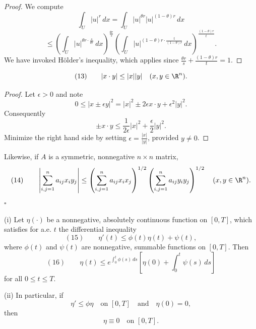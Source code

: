 \begin{proof}
We compute
$$\int_U |u|^r\,dx = \int_U |u|^{\theta r}|u|^{(1-\theta)r}\,dx$$
$$\leq \left(\int_U |u|^{\theta r \cdot \frac{s}{\theta r}}\,dx\right)^{\frac{\theta r}{s}} \left(\int_U |u|^{(1-\theta)r \cdot \frac{t}{(1-\theta) r}}\,dx\right)^{\frac{(1-\theta) r}{t}}.$$
We have invoked Hölder's inequality, which applies since $\frac{\theta r}{s} + \frac{(1-\theta)r}{t} = 1$.
\end{proof}

\begin{lemma}
\label{lem:cauchy-schwarz-inequality}
$$(13) \qquad |x \cdot y| \leq |x||y| \quad (x,y \in \R^n).$$
\end{lemma}

\begin{proof}
Let $\epsilon > 0$ and note
$$0 \leq |x \pm \epsilon y|^2 = |x|^2 \pm 2\epsilon x \cdot y + \epsilon^2 |y|^2.$$
Consequently
$$\pm x \cdot y \leq \frac{1}{2\epsilon}|x|^2 + \frac{\epsilon}{2}|y|^2.$$
Minimize the right hand side by setting $\epsilon = \frac{|x|}{|y|}$, provided $y \neq 0$.
\end{proof}

\begin{remark}
\label{rem:cauchy-schwarz-matrix-form}
Likewise, if $A$ is a symmetric, nonnegative $n \times n$ matrix,
$$(14) \qquad \left|\sum_{i,j=1}^{n} a_{ij}x_iy_j\right| \leq \left(\sum_{i,j=1}^{n} a_{ij}x_ix_j\right)^{1/2} \left(\sum_{i,j=1}^{n} a_{ij}y_iy_j\right)^{1/2} \quad (x,y \in \R^n).$$
$\square$
\end{remark}

\begin{lemma}
\label{lem:gronwalls-inequality-differential-form}
(i) Let $\eta(\cdot)$ be a nonnegative, absolutely continuous function on $[0,T]$, which satisfies for a.e. $t$ the differential inequality
$$(15) \qquad \eta'(t) \leq \phi(t)\eta(t) + \psi(t),$$
where $\phi(t)$ and $\psi(t)$ are nonnegative, summable functions on $[0,T]$. Then
$$(16) \qquad \eta(t) \leq e^{\int_0^t \phi(s)\,ds}\left[\eta(0) + \int_0^t \psi(s)\,ds\right]$$
for all $0 \leq t \leq T$.

(ii) In particular, if
$$\eta' \leq \phi\eta \quad \text{on } [0,T] \quad \text{and} \quad \eta(0) = 0,$$
then
$$\eta \equiv 0 \quad \text{on } [0,T].$$
\end{lemma}

